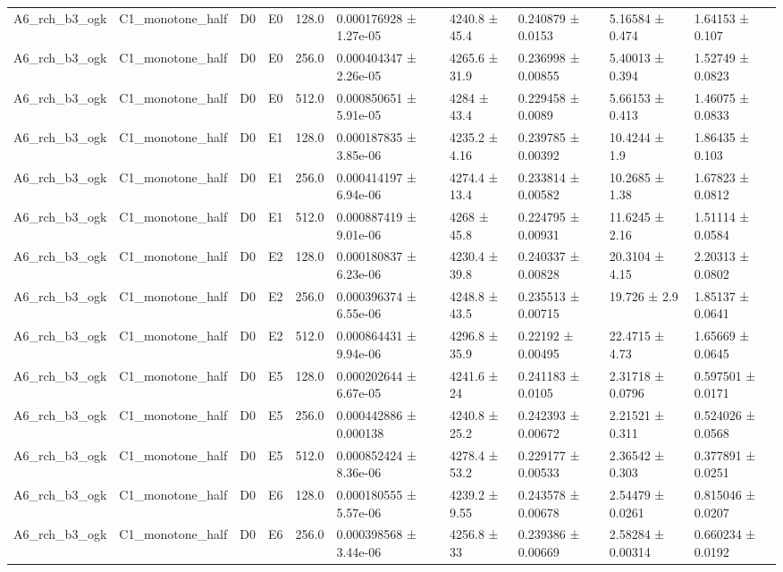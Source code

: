 \begin{table}
\begin{tabular}{llllllllll}
A6\_rch\_b3\_ogk & C1\_monotone\_half & D0 & E0 & 128.0 & 0.000176928 ± 1.27e-05 & 4240.8 ± 45.4 & 0.240879 ± 0.0153 & 5.16584 ± 0.474 & 1.64153 ± 0.107 \\
A6\_rch\_b3\_ogk & C1\_monotone\_half & D0 & E0 & 256.0 & 0.000404347 ± 2.26e-05 & 4265.6 ± 31.9 & 0.236998 ± 0.00855 & 5.40013 ± 0.394 & 1.52749 ± 0.0823 \\
A6\_rch\_b3\_ogk & C1\_monotone\_half & D0 & E0 & 512.0 & 0.000850651 ± 5.91e-05 & 4284 ± 43.4 & 0.229458 ± 0.0089 & 5.66153 ± 0.413 & 1.46075 ± 0.0833 \\
A6\_rch\_b3\_ogk & C1\_monotone\_half & D0 & E1 & 128.0 & 0.000187835 ± 3.85e-06 & 4235.2 ± 4.16 & 0.239785 ± 0.00392 & 10.4244 ± 1.9 & 1.86435 ± 0.103 \\
A6\_rch\_b3\_ogk & C1\_monotone\_half & D0 & E1 & 256.0 & 0.000414197 ± 6.94e-06 & 4274.4 ± 13.4 & 0.233814 ± 0.00582 & 10.2685 ± 1.38 & 1.67823 ± 0.0812 \\
A6\_rch\_b3\_ogk & C1\_monotone\_half & D0 & E1 & 512.0 & 0.000887419 ± 9.01e-06 & 4268 ± 45.8 & 0.224795 ± 0.00931 & 11.6245 ± 2.16 & 1.51114 ± 0.0584 \\
A6\_rch\_b3\_ogk & C1\_monotone\_half & D0 & E2 & 128.0 & 0.000180837 ± 6.23e-06 & 4230.4 ± 39.8 & 0.240337 ± 0.00828 & 20.3104 ± 4.15 & 2.20313 ± 0.0802 \\
A6\_rch\_b3\_ogk & C1\_monotone\_half & D0 & E2 & 256.0 & 0.000396374 ± 6.55e-06 & 4248.8 ± 43.5 & 0.235513 ± 0.00715 & 19.726 ± 2.9 & 1.85137 ± 0.0641 \\
A6\_rch\_b3\_ogk & C1\_monotone\_half & D0 & E2 & 512.0 & 0.000864431 ± 9.94e-06 & 4296.8 ± 35.9 & 0.22192 ± 0.00495 & 22.4715 ± 4.73 & 1.65669 ± 0.0645 \\
A6\_rch\_b3\_ogk & C1\_monotone\_half & D0 & E5 & 128.0 & 0.000202644 ± 6.67e-05 & 4241.6 ± 24 & 0.241183 ± 0.0105 & 2.31718 ± 0.0796 & 0.597501 ± 0.0171 \\
A6\_rch\_b3\_ogk & C1\_monotone\_half & D0 & E5 & 256.0 & 0.000442886 ± 0.000138 & 4240.8 ± 25.2 & 0.242393 ± 0.00672 & 2.21521 ± 0.311 & 0.524026 ± 0.0568 \\
A6\_rch\_b3\_ogk & C1\_monotone\_half & D0 & E5 & 512.0 & 0.000852424 ± 8.36e-06 & 4278.4 ± 53.2 & 0.229177 ± 0.00533 & 2.36542 ± 0.303 & 0.377891 ± 0.0251 \\
A6\_rch\_b3\_ogk & C1\_monotone\_half & D0 & E6 & 128.0 & 0.000180555 ± 5.57e-06 & 4239.2 ± 9.55 & 0.243578 ± 0.00678 & 2.54479 ± 0.0261 & 0.815046 ± 0.0207 \\
A6\_rch\_b3\_ogk & C1\_monotone\_half & D0 & E6 & 256.0 & 0.000398568 ± 3.44e-06 & 4256.8 ± 33 & 0.239386 ± 0.00669 & 2.58284 ± 0.00314 & 0.660234 ± 0.0192 \\

\end{tabular}
\end{table}

